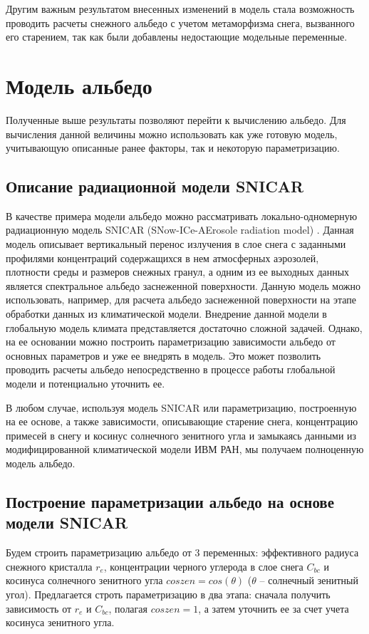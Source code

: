 \documentclass[a4paper, fontsize=14pt]{scrartcl}
\begin{document}
Другим важным результатом внесенных изменений в модель стала возможность проводить расчеты снежного альбедо с учетом метаморфизма снега, вызванного его старением, так как были добавлены недостающие модельные переменные.


\newpage
\section{Модель альбедо}

Полученные выше результаты позволяют перейти к вычислению альбедо. Для вычисления данной величины можно использовать как уже готовую модель, учитывающую описанные ранее факторы, так и некоторую параметризацию. 

\subsection{Описание радиационной модели SNICAR}
В качестве примера модели альбедо можно рассматривать локально-одномерную радиационную модель SNICAR (SNow-ICe-AErosole radiation model) \cite{Flanner2007}. Данная модель описывает вертикальный перенос излучения в слое снега с заданными профилями концентраций содержащихся в нем атмосферных аэрозолей, плотности среды и размеров снежных гранул, а одним из ее выходных данных является спектральное альбедо заснеженной поверхности. Данную модель можно использовать, например, для расчета альбедо заснеженной поверхности на этапе обработки данных из климатической модели. Внедрение данной модели в глобальную модель климата представляется достаточно сложной задачей. Однако, на ее основании можно построить параметризацию зависимости альбедо от основных параметров и уже ее внедрять в модель. Это может позволить проводить расчеты альбедо непосредственно в процессе работы глобальной модели и потенциально уточнить ее.

В любом случае, используя модель SNICAR или параметризацию, построенную на ее основе, а также зависимости, описывающие старение снега, концентрацию примесей в снегу и косинус солнечного зенитного угла и замыкаясь данными из модифицированной климатической модели ИВМ РАН, мы получаем полноценную модель альбедо.

\subsection{Построение параметризации альбедо на основе модели SNICAR}

Будем строить параметризацию альбедо от 3 переменных: эффективного радиуса снежного кристалла $r_e$, концентрации черного углерода в слое снега $C_{bc}$ и косинуса солнечного зенитного угла $coszen = cos(\theta)$ ($\theta$ -- солнечный зенитный угол). Предлагается строть параметризацию в два этапа: сначала получить зависимость от $r_e$ и $C_{bc}$, полагая $coszen = 1$, а затем уточнить ее за счет учета косинуса зенитного угла.
\end{document}
